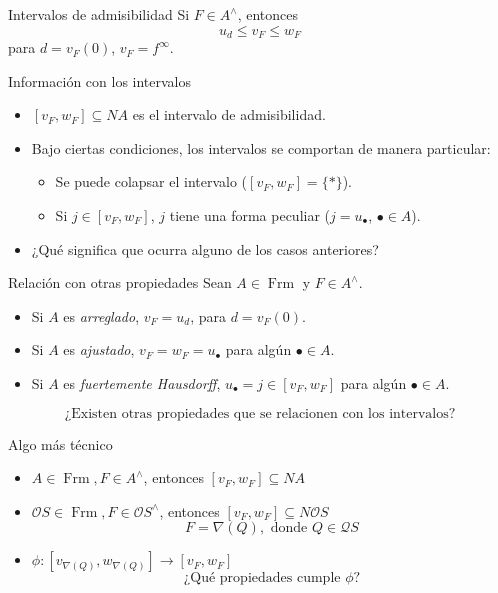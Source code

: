 \documentclass[compress,12pt]{beamer}
\DeclareMathOperator{\Frm}{Frm}
\begin{document}
\begin{frame}{Intervalos de admisibilidad}
Si $F\in A^\wedge$, entonces 
\[
u_d\leq v_F \leq  w_F
\] 
para $d=v_F(0)$, $v_F=f^\infty$.

\begin{block}{Información con los intervalos}
\begin{itemize}
\item<2-> $[v_F, w_F]\subseteq NA$ es el intervalo de admisibilidad.
\item<3-> Bajo ciertas condiciones, los intervalos se comportan de manera particular:
\begin{itemize}
    \item<4-> Se puede colapsar el intervalo ($[v_F, w_F]=\{*\}$).
    \item<5-> Si $j\in [v_F, w_F]$, $j$ tiene una forma peculiar ($j=u_\bullet$, $\bullet\in A$).
\end{itemize}
\item<6-> ¿Qué significa que ocurra alguno de los casos anteriores?
\end{itemize}
\end{block}
\end{frame}

\begin{frame}{Relación con otras propiedades}
Sean $A\in \Frm$ y $F\in A^\wedge$.
\begin{itemize}
\item<2-> Si $A$ es \emph{arreglado}, $v_F=u_d$, para $d=v_F(0)$.
\item<3-> Si $A$ es \emph{ajustado}, $v_F=w_F=u_\bullet$ para algún $\bullet\in A$.
\item<4-> Si $A$ es \emph{fuertemente Hausdorff}, $u_\bullet=j\in [v_F,w_F]$ para algún $\bullet\in A$.
\end{itemize}
\[
\mbox{¿Existen otras propiedades que se relacionen con los intervalos?}
\]
\end{frame}

\begin{frame}{Algo más técnico}
\begin{itemize}
\item $A\in\Frm, F\in A^\wedge$, entonces $[v_F, w_F]\subseteq NA$
\item<2-> $\mathcal{O}S\in \Frm, F\in \mathcal{O}S^\wedge$, entonces $[v_F, w_F]\subseteq N\mathcal{O}S$
\[F=\nabla(Q), \mbox{ donde } Q\in \mathcal{Q}S\]

\item<4-> $\phi\colon [v_{\nabla(Q)},w_{\nabla(Q)}]\to [v_F, w_F]$
\[
\mbox{¿Qué propiedades cumple $\phi$?}
\]
\end{itemize}
\end{frame}
\end{document}
